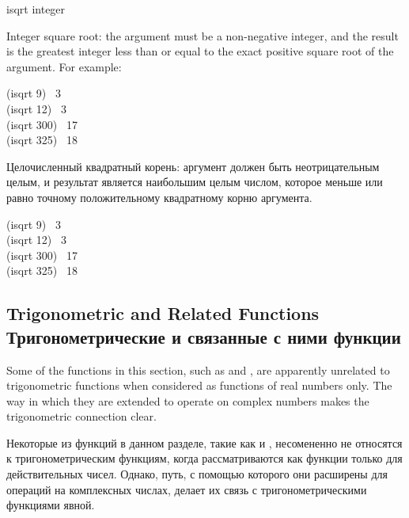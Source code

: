 \begin{defun}[Function]
isqrt integer

Integer square root: the argument must be a non-negative integer, and the
result is the greatest integer less than or equal to the exact positive
square root of the argument.
For example:
\begin{lisp}
(isqrt 9) \EV\ 3 \\
(isqrt 12) \EV\ 3 \\
(isqrt 300) \EV\ 17 \\
(isqrt 325) \EV\ 18
\end{lisp}

Целочисленный квадратный корень: аргумент должен быть неотрицательным целым, и
результат является наибольшим целым числом, которое меньше или равно точному
положительному квадратному корню аргумента.
\begin{lisp}
(isqrt 9) \EV\ 3 \\
(isqrt 12) \EV\ 3 \\
(isqrt 300) \EV\ 17 \\
(isqrt 325) \EV\ 18
\end{lisp}
\end{defun}

\subsection{Trigonometric and Related Functions Тригонометрические и связанные с
ними функции}

Some of the functions in this section, such as 
and , are apparently unrelated
to trigonometric functions when considered as functions of
real numbers only.  The way in which they are extended to
operate on complex numbers makes the trigonometric connection clear.

Некоторые из функций в данном разделе, такие как  и ,
несомененно не относятся к тригонометрическим функциям, когда рассматриваются
как функции только для действительных чисел. Однако, путь, с помощью которого
они расширены для операций на комплексных числах, делает их связь с
тригонометрическими функциями явной.

